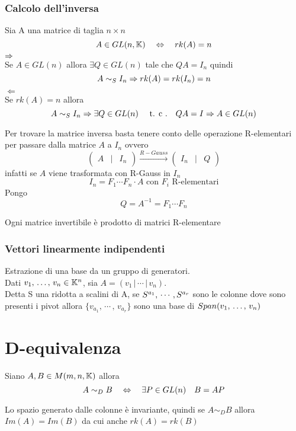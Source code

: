 \subsubsection{Calcolo dell'inversa}
\begin{prop}
Sia A una matrice di taglia $ n \times n$ 
$$ A \in GL(n, \mathbb{K}) \quad \Leftrightarrow \quad rk(A)= n $$
\proof $\Rightarrow$\\
Se $ A \in GL(n) $ allora $\exists Q \in  GL(n) $ tale che $QA=I_n$ quindi
$$ A \sim_S I_n \Rightarrow rk(A)=rk(I_n)=n $$
\proof $\Leftarrow$\\
Se $ rk(A)=n $ allora
 $$A\sim_S I_n \Rightarrow \exists Q \in GL(n) \quad \text{ t. c .} \quad QA=I \Rightarrow A \in GL(n)$$
\endproof
\begin{oss}
Per trovare la matrice inversa basta tenere conto delle operazione R-elementari per passare dalla matrice $ A $ a $I_n$ ovvero 
$$ \begin{pmatrix}
A & \vert &I_n 
\end{pmatrix} \xrightarrow{R-Gauss} \begin{pmatrix}
I_n &\vert &  Q
\end{pmatrix}
$$
infatti se $A$ viene trasformata con R-Gauss in $I_n$ 
$$ I_n= F_1 \cdots F_n \cdot A \text { con }  F_i \text{  R-elementari} $$
Pongo $$Q =A^{-1}=  F_1 \cdots F_n$$
\end{oss}
\end{prop}
\begin{cor} Ogni matrice invertibile \`e prodotto di matrici R-elementare
\end{cor}
\spazio
\subsubsection{Vettori linearmente indipendenti}
\begin{prop} Estrazione di una base da un gruppo di generatori.\\
Dati $v_1, \, \dots , \, v_n \in \mathbb{K} ^n $, sia $ A= ( v_1 \, \vert \, \cdots \, \vert \, v_n )$.\\
Detta S una ridotta a scalini di A, se $ S^{a_1} , \, \cdots \, , S^{ a_r} $ sono le colonne dove sono presenti i pivot allora $ \{ v_{a_1}, \, \cdots \, ,\, v_{a_r} \} $ sono una base di $Span( v_1, \, \dots , \, v_n ) $
\end{prop}
\newpage
\section{D-equivalenza}
\begin{defn}[D-equivalenza]\bianco
Siano $A,B \in M(m,n,\mathbb{K}) $ allora
$$ A \sim_D B \quad \Leftrightarrow \quad \exists P \in GL(n) \quad B=AP$$
\end{defn}
\begin{oss} Lo spazio generato dalle colonne \`e invariante, quindi se $A
\sim_D B $ allora $Im(A)=Im(B) $ da cui anche $rk(A)=rk(B) $
\end{oss}

